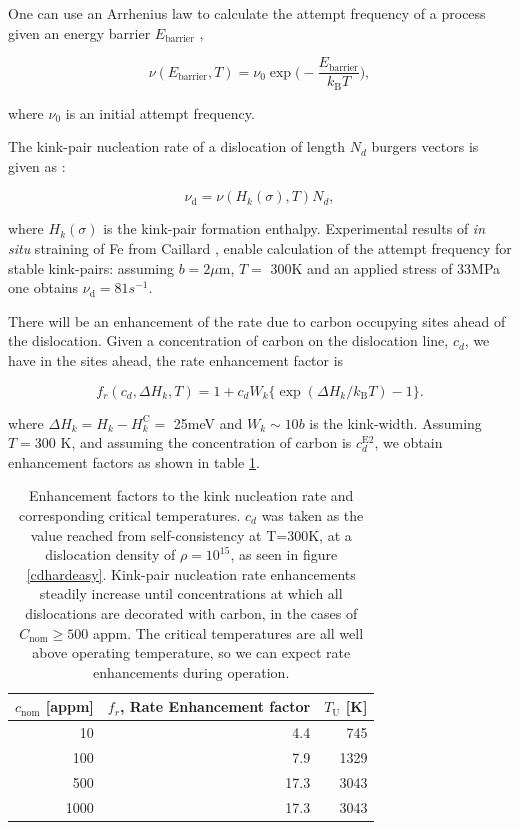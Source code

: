 \documentclass[a4paper,11pt]{article}
\begin{document}
One can use an Arrhenius law to calculate the attempt frequency of a process given an
energy barrier \(E_{\text{barrier} }\) \cite{Henkelman2000},

\begin{equation} \label{eq:jumprate}
   \nu ( E_{\text{barrier}},T ) = \nu_0 \exp \big( - \frac{ E_{\text{barrier} }}{ k_{\text{B}} T} \big),
\end{equation}

where \(\nu_0\) is an initial attempt frequency.

The kink-pair nucleation rate of a dislocation of length \(N_d\) burgers vectors is
given as \cite{itakura13_effec_hydrog_atoms_screw_disloc}:


\begin{equation} \label{eq:kinkrate}
\nu_{\text{d}} = \nu ( H_k(\sigma),T ) N_d,
\end{equation}

where \(H_k(\sigma)\) is the kink-pair formation
enthalpy. Experimental results of \emph{in situ} straining of Fe from Caillard
\cite{Caillard2010}, enable calculation of the attempt frequency for stable
kink-pairs: assuming \(b = 2\mu\text{m}\), \(T=\) 300K and an applied stress of
33MPa one obtains \(\nu_{\text{d} } = 81s^{-1}\).

There will be an enhancement of the rate due to carbon occupying sites ahead
of the dislocation. Given a concentration of carbon on the dislocation line, \(c_d\), we
have in the sites ahead, the rate enhancement factor is

\begin{equation} \label{eq:enhancementfactor}
  f_r(c_d,\Delta H_{k},T) = 1 + c_d W_k \{  \exp( \Delta H_{k}/k_{\text{B}}T ) - 1 \}.
\end{equation}

where \(\Delta H_{k} = H_k - H_k^{\text{C}} =\) 25meV and \(W_k \sim 10b\) is the
kink-width. Assuming \(T=300\) K, and assuming the concentration of carbon is
\(c_d^{\text{E2}}\), we obtain enhancement factors as
shown in table \ref{rateenhancement}.


\begin{table}[htbp]
\caption{Enhancement factors to the kink nucleation rate and corresponding critical temperatures. \(c_d\) was taken as the value reached from self-consistency at T=300K, at a dislocation density of \(\rho = 10^{15}\), as seen in figure \ref{cdhardeasy}. Kink-pair nucleation rate enhancements steadily increase until concentrations at which all dislocations are decorated with carbon, in the cases of \(C_{\text{nom}} \geq 500\) appm. The critical temperatures are all well above operating temperature, so we can expect rate enhancements during operation. \label{rateenhancement}}
\centering
\begin{tabular}{rrr}
\(c_{\text{nom}}\) [appm] & \(f_r\), Rate Enhancement factor & \(T_{\text{U}}\) [K]\\
\hline
10 & 4.4 & 745\\
100 & 7.9 & 1329\\
500 & 17.3 & 3043\\
1000 & 17.3 & 3043\\
\end{tabular}
\end{table}
\end{document}
